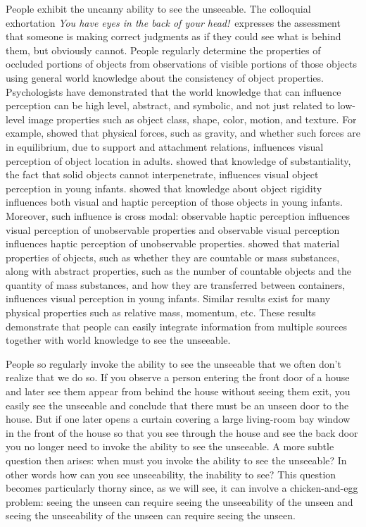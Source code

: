 \noindent People exhibit the uncanny ability to see the unseeable.
%
The colloquial exhortation \emph{You have eyes in the back of your
  head!}\ expresses the assessment that someone is making correct judgments as
if they could see what is behind them, but obviously cannot.
%
People regularly determine the properties of occluded portions of objects from
observations of visible portions of those objects using general world knowledge
about the consistency of object properties.
%
Psychologists have demonstrated that the world knowledge that can influence
perception can be high level, abstract, and symbolic, and not just related to
low-level image properties such as object class, shape, color, motion, and
texture.
%
For example,  showed that physical forces, such as
gravity, and whether such forces are in equilibrium, due to support and
attachment relations, influences visual perception of object location in adults.
%
 showed that knowledge of
substantiality, the fact that solid objects cannot interpenetrate, influences
visual object perception in young infants.
 showed that knowledge about object rigidity
influences both visual and haptic perception of those objects in young infants.
%
Moreover, such influence is cross modal: observable haptic perception
influences visual perception of unobservable properties and observable visual
perception influences haptic perception of unobservable properties.
 showed that material properties of objects, such as
whether they are countable or mass substances, along with abstract properties,
such as the number of countable objects and the quantity of mass substances, and
how they are transferred between containers, influences visual perception in
young infants.
%
Similar results exist for many physical properties such as relative mass,
momentum, etc.
%
These results demonstrate that people can easily integrate information from
multiple sources together with world knowledge to see the unseeable.

People so regularly invoke the ability to see the unseeable that we often don't
realize that we do so.
%
If you observe a person entering the front door of a house and later see them
appear from behind the house without seeing them exit, you easily see the
unseeable and conclude that there must be an unseen door to the house.
%
But if one later opens a curtain covering a large living-room bay window in the
front of the house so that you see through the house and see the back door you
no longer need to invoke the ability to see the unseeable.
%
A more subtle question then arises: when must you invoke the ability to see the
unseeable?
%
In other words how can you see unseeability, the inability to see?
%
This question becomes particularly thorny since, as we will see, it can
involve a chicken-and-egg problem: seeing the unseen can require seeing the
unseeability of the unseen and seeing the unseeability of the unseen can
require seeing the unseen.

